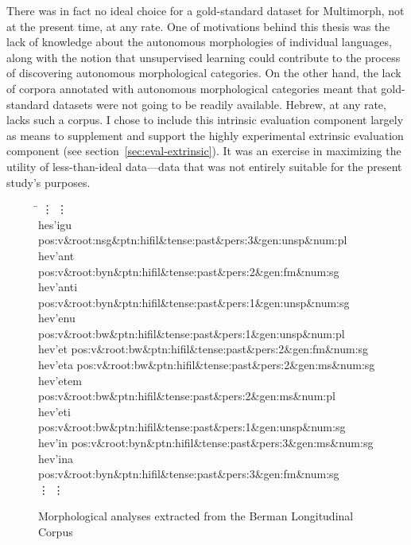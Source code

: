 There was in fact no ideal choice for a gold-standard dataset for Multimorph, 
not at the present time, at any rate. One of motivations behind this 
thesis was the lack of knowledge about the autonomous morphologies 
of individual languages, along with the notion that unsupervised learning could contribute to the 
process of discovering autonomous morphological categories. On the other hand, the lack
of corpora annotated with autonomous morphological categories meant 
that gold-standard datasets were not going to be readily available. Hebrew, at any rate,
lacks such a corpus. 
I chose to include this intrinsic evaluation component largely as means 
to supplement and support the highly experimental extrinsic evaluation 
component (see section~\ref{sec:eval-extrinsic}).  It was an exercise in maximizing the utility of less-than-ideal 
data---data that was not entirely
suitable for the present study's purposes.

\begin{figure}[t]
\begin{mdframed}
\begin{tabbing}
\hspace{1in} \= \hspace{5.5in} \kill
\vdots \> \vdots \\
hes\a'{i}gu \> pos:v\&root:nsg\&ptn:hifil\&tense:past\&pers:3\&gen:unsp\&num:pl \\
hev\a'{a}nt \> pos:v\&root:byn\&ptn:hifil\&tense:past\&pers:2\&gen:fm\&num:sg \\
hev\a'{a}nti \> pos:v\&root:byn\&ptn:hifil\&tense:past\&pers:1\&gen:unsp\&num:sg \\
hev\a'{e}nu \> pos:v\&root:bw\&ptn:hifil\&tense:past\&pers:1\&gen:unsp\&num:pl \\
hev\a'{e}t \> pos:v\&root:bw\&ptn:hifil\&tense:past\&pers:2\&gen:fm\&num:sg \\
hev\a'{e}ta \> pos:v\&root:bw\&ptn:hifil\&tense:past\&pers:2\&gen:ms\&num:sg \\
hev\a'{e}tem \> pos:v\&root:bw\&ptn:hifil\&tense:past\&pers:2\&gen:ms\&num:pl \\
hev\a'{e}ti \> pos:v\&root:bw\&ptn:hifil\&tense:past\&pers:1\&gen:unsp\&num:sg \\
hev\a'{i}n \> pos:v\&root:byn\&ptn:hifil\&tense:past\&pers:3\&gen:ms\&num:sg \\
hev\a'{i}na \> pos:v\&root:byn\&ptn:hifil\&tense:past\&pers:3\&gen:fm\&num:sg \\
\vdots \> \vdots \\
\end{tabbing}
\caption{Morphological analyses extracted from the Berman Longitudinal Corpus}
\label{fig:verb-analyses}
\end{mdframed}
\end{figure}

